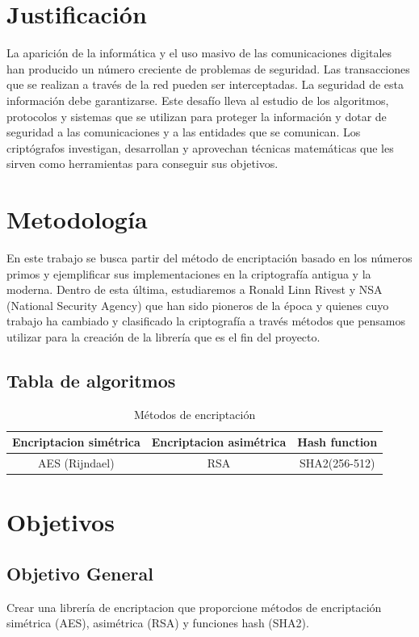 \documentclass[spanish]{article}
\begin{document}
\section{Justificación}
La aparición de la informática y el uso masivo de las comunicaciones digitales han producido un número creciente de problemas de seguridad. Las transacciones que se realizan a través de la red pueden ser interceptadas. La seguridad de esta información debe garantizarse. Este desafío lleva al estudio de los algoritmos, protocolos y sistemas que se utilizan para proteger la información y dotar de seguridad a las comunicaciones y a las entidades que se comunican. Los criptógrafos investigan, desarrollan y aprovechan técnicas matemáticas que les sirven como herramientas para conseguir sus objetivos. 

\section{Metodología}
En este trabajo se busca partir del método de encriptación basado en los números primos y ejemplificar sus implementaciones en la criptografía antigua y la moderna. Dentro de esta última, estudiaremos a Ronald Linn Rivest y NSA (National Security Agency) que han sido pioneros de la época y quienes cuyo trabajo ha cambiado y clasificado la criptografía a través métodos que pensamos utilizar para la creación de la librería que es el fin del proyecto.

\subsection{Tabla de algoritmos}
\begin{table}[h]
\begin{center}
\begin{tabular}{c | c | c}
\toprule[0.3mm]
Encriptacion simétrica & Encriptacion asimétrica & Hash function \\
\midrule
AES (Rijndael) & RSA & SHA2(256-512)\\
\bottomrule[0.3mm]
\end{tabular}
\end{center}
\caption{Métodos de encriptación}
\end{table}


\section{Objetivos}

\subsection{Objetivo General}
Crear una librería de encriptacion que proporcione métodos de encriptación simétrica (AES), asimétrica (RSA) y funciones hash (SHA2). 
\end{document}
